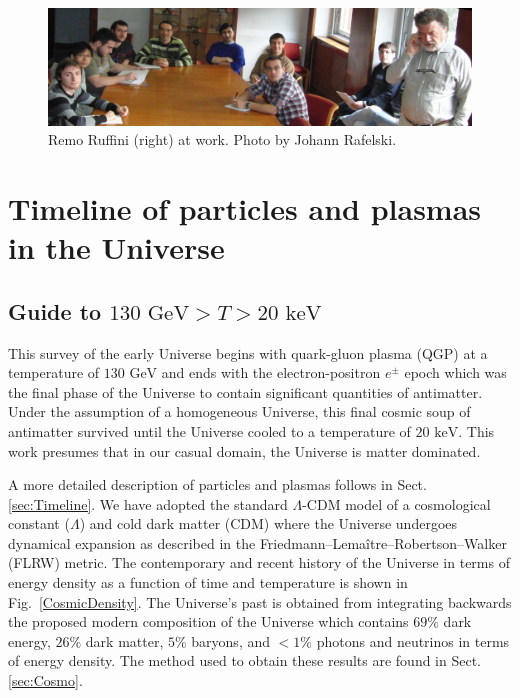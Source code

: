 \documentclass[universe,article,submit,moreauthors,pdftex,a4paper]{Definitions/mdpi}
\newcommand{\GeV}{\text{ GeV}}
\newcommand{\keV}{\text{ keV}}
\newcommand*{\rf}[1]{Fig.~{\ref{#1}}}
\newcommand*{\rsec}[1]{Sect.\,{\ref{#1}}}
\begin{document}

\begin{figure}[H]
  \centering  \includegraphics[width=\textwidth]{12MarchRemoAtWorkC.jpg}
  \caption{Remo Ruffini (right) at work. Photo by Johann Rafelski. \label{RemoAtWork}}
\end{figure}

\tableofcontents

\section{Timeline of particles and plasmas in the Universe}\label{sec:Intro}
\subsection{Guide to $130\GeV>T>20\keV$}\label{sec:Guide}
\noindent This survey of the early Universe begins with quark-gluon plasma (QGP) at a temperature of $130\GeV$ and ends with the electron-positron $e^{\pm}$ epoch which was the final phase of the Universe to contain significant quantities of antimatter. Under the assumption of a homogeneous Universe, this final cosmic soup of antimatter survived until the Universe cooled to a temperature of $20\keV$. This work presumes that in our casual domain, the Universe is matter dominated.

A more detailed description of particles and plasmas follows in \rsec{sec:Timeline}. We have adopted the standard $\Lambda$-CDM model of a cosmological constant ($\Lambda$) and cold dark matter (CDM) where the Universe undergoes dynamical expansion as described in the Friedmann–Lemaître–Robertson–Walker (FLRW) metric. The contemporary and recent history of the Universe in terms of energy density as a function of time and temperature is shown in \rf{CosmicDensity}. The Universe's past is obtained from integrating backwards the proposed modern composition of the Universe which contains $69\%$ dark energy, $26\%$ dark matter, $5\%$ baryons, and $<1\%$ photons and neutrinos in terms of energy density. The method used to obtain these results are found in \rsec{sec:Cosmo}.
\end{document}
